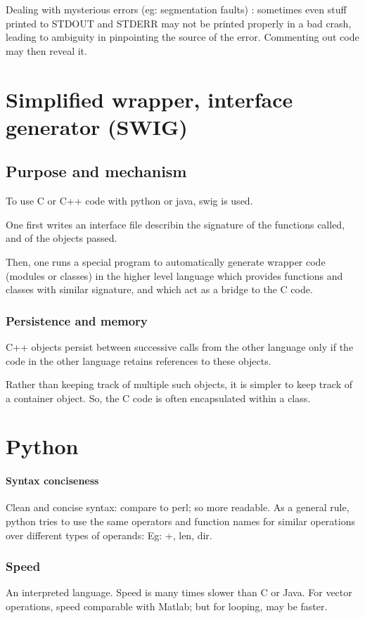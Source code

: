 \documentclass[oneside, article]{memoir}
\begin{document}
Dealing with mysterious errors (eg: segmentation faults) : sometimes even stuff printed to STDOUT and STDERR may not be printed properly in a bad crash, leading to ambiguity in pinpointing the source of the error. Commenting out code may then reveal it.

\chapter{Simplified wrapper, interface generator (SWIG)}
\section{Purpose and mechanism}
To use C or C++ code with python or java, swig is used.

One first writes an interface file describin the signature of the functions called, and of the objects passed.

Then, one runs a special program to automatically generate wrapper code (modules or classes) in the higher level language which provides functions and classes with similar signature, and which act as a bridge to the C code.

\subsection{Persistence and memory}
C++ objects persist between successive calls from the other language only if the code in the other language retains references to these objects.

Rather than keeping track of multiple such objects, it is simpler to keep track of a container object. So, the C code is often encapsulated within a class.


\tbc

\chapter{Python}
\subsubsection{Syntax conciseness}
Clean and concise syntax: compare to perl; so more readable. As a general rule, python tries to use the same operators and function names for similar operations over different types of operands: Eg: +, len, dir.

\subsection{Speed}
An interpreted language. Speed is many times slower than C or Java. For vector operations, speed comparable with Matlab; but for looping, may be faster.
\end{document}
